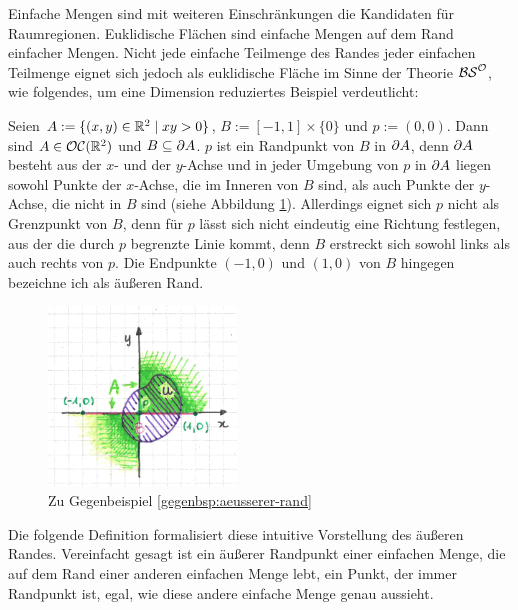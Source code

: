     Einfache
    Mengen sind mit weiteren Einschränkungen die Kandidaten für Raumregionen. Euklidische Flächen sind einfache Mengen auf dem Rand einfacher Mengen.
    Nicht jede einfache Teilmenge des Randes jeder einfachen Teilmenge eignet sich jedoch als euklidische Fläche im Sinne der Theorie $\mathcal{BS}^{\mathcal{O}}$, wie folgendes, um eine Dimension reduziertes Beispiel verdeutlicht:
%
    \begin{gegenbsp}\label{gegenbsp:aeusserer-rand}
        Seien $A := \{(x,y) \in \mathbb{R}^2 \mid xy > 0\}$, $B := [-1,1] \times \{0\}$ und $p := (0,0)$. 
        Dann sind $A \in \mathcal{OC}(\mathbb{R}^2)$ und $B \subseteq \partial A$.
        $p$ ist ein Randpunkt von $B$ in $\partial A$, denn $\partial A$ besteht aus der $x$- und der $y$-Achse und in jeder Umgebung von $p$ in $\partial A$ liegen sowohl Punkte der $x$-Achse, die im Inneren von $B$ sind, als auch Punkte der $y$-Achse, die nicht in $B$ sind (siehe Abbildung \ref{fig:kein-aeusserer-rand}).
        Allerdings eignet sich $p$ nicht als Grenzpunkt von $B$, denn für $p$ lässt sich nicht eindeutig eine Richtung festlegen, \glqq aus der die durch $p$ begrenzte Linie kommt\grqq, denn $B$ erstreckt sich sowohl links als auch rechts von $p$.
        Die Endpunkte $(-1,0)$ und $(1,0)$ von $B$ hingegen bezeichne ich als äußeren Rand.
    \end{gegenbsp}
%    
    \begin{figure}[ht]
        \centering
        \includegraphics[width=5cm]{abb/kein-aeusserer-rand.png}
        \caption{Zu Gegenbeispiel \ref{gegenbsp:aeusserer-rand}}
        \label{fig:kein-aeusserer-rand}
    \end{figure}
%
    Die
    folgende Definition formalisiert diese intuitive Vorstellung des äußeren Randes.
    Vereinfacht gesagt ist ein äußerer Randpunkt einer einfachen Menge, die auf dem Rand einer anderen einfachen Menge \glqq lebt\grqq, ein Punkt, der immer Randpunkt ist, egal, wie diese andere einfache Menge genau aussieht.
